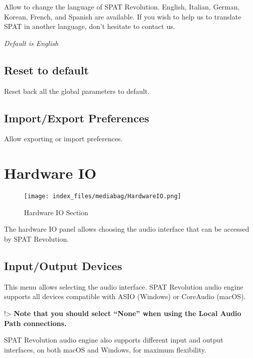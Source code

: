 \documentclass[
  letterpaper,
  DIV=11,
  numbers=noendperiod]{scrreport}
\begin{document}
Allow to change the language of SPAT Revolution. English, Italian,
German, Korean, French, and Spanish are available. If you wish to help
us to translate SPAT in another language, don't hesitate to contact us.

\emph{Default is English}

\hypertarget{reset-to-default}{%
\subsection{Reset to default}\label{reset-to-default}}

Reset back all the global parameters to default.

\hypertarget{importexport-preferences}{%
\subsection{Import/Export Preferences}\label{importexport-preferences}}

Allow exporting or import preferences.

\hypertarget{hardware-io}{%
\section{Hardware IO}\label{hardware-io}}

\begin{figure}

{\centering \texttt{[image: index\_files/mediabag/HardwareIO.png]}

}

\caption{Hardware IO Section}

\end{figure}

The hardware IO panel allows choosing the audio interface that can be
accessed by SPAT Revolution.

\hypertarget{inputoutput-devices}{%
\subsection{Input/Output Devices}\label{inputoutput-devices}}

This menu allows selecting the audio interface. SPAT Revolution audio
engine supports all devices compatible with ASIO (Windows) or CoreAudio
(macOS).

!\textgreater{} \textbf{Note that you should select ``None'' when using
the Local Audio Path connections.}

SPAT Revolution audio engine also supports different input and output
interfaces, on both macOS and Windows, for maximum flexibility.
\end{document}
